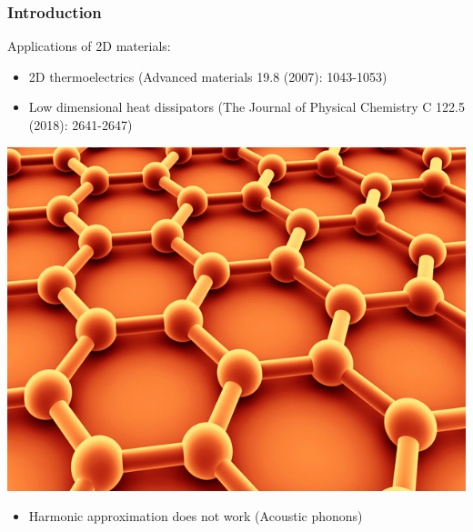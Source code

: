 \documentclass{beamer}
\begin{document}
\begin{frame}

\frametitle{Introduction}
Applications of 2D materials:
\begin{itemize}
  \item 2D thermoelectrics (Advanced materials 19.8 (2007): 1043-1053)
  \item Low dimensional heat dissipators (The Journal of Physical Chemistry C 122.5 (2018): 2641-2647)
\end{itemize}
\begin{center}
\vspace{-0.2cm}
\includegraphics[width=0.5\linewidth]{Pictures/INTRO/grapheneImage.jpeg}
\end{center}
\vspace{-0.2cm}
\begin{itemize}
 \item Harmonic approximation does not work (Acoustic phonons)
\end{itemize}

\end{frame}

\end{document}
